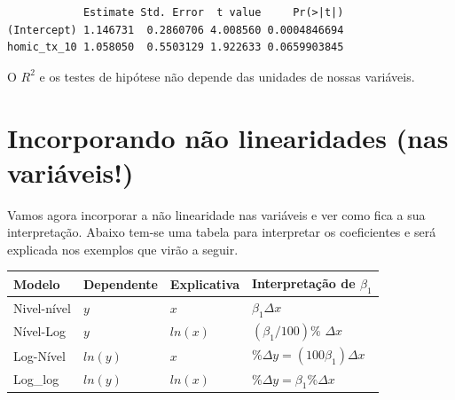 \documentclass[
  letterpaper,
  DIV=11,
  numbers=noendperiod]{scrreprt}
\begin{document}
\begin{verbatim}
            Estimate Std. Error  t value     Pr(>|t|)
(Intercept) 1.146731  0.2860706 4.008560 0.0004846694
homic_tx_10 1.058050  0.5503129 1.922633 0.0659903845
\end{verbatim}

\begin{tcolorbox}[enhanced jigsaw, leftrule=.75mm, coltitle=black, colframe=quarto-callout-note-color-frame, toprule=.15mm, opacitybacktitle=0.6, bottomtitle=1mm, bottomrule=.15mm, titlerule=0mm, toptitle=1mm, title=\textcolor{quarto-callout-note-color}{\faInfo}\hspace{0.5em}{Importante}, arc=.35mm, breakable, opacityback=0, colbacktitle=quarto-callout-note-color!10!white, colback=white, left=2mm, rightrule=.15mm]

O \(R^2\) e os testes de hipótese não depende das unidades de nossas
variáveis.

\end{tcolorbox}

\section{Incorporando não linearidades (nas
variáveis!)}\label{incorporando-nuxe3o-linearidades-nas-variuxe1veis}

Vamos agora incorporar a não linearidade nas variáveis e ver como fica a
sua interpretação. Abaixo tem-se uma tabela para interpretar os
coeficientes e será explicada nos exemplos que virão a seguir.

\begin{longtable}[]{@{}
  >{\raggedright\arraybackslash}p{}
  >{\raggedright\arraybackslash}p{}
  >{\raggedright\arraybackslash}p{}
  >{\raggedright\arraybackslash}p{}@{}}
\toprule\noalign{}
\begin{minipage}[b]{\linewidth}\raggedright
Modelo
\end{minipage} & \begin{minipage}[b]{\linewidth}\raggedright
Dependente
\end{minipage} & \begin{minipage}[b]{\linewidth}\raggedright
Explicativa
\end{minipage} & \begin{minipage}[b]{\linewidth}\raggedright
Interpretação de \(\beta_1\)
\end{minipage} \\
\midrule\noalign{}
\endhead
\bottomrule\noalign{}
\endlastfoot
Nivel-nível & \(y\) & \(x\) & \(\beta_1 \Delta x\) \\
Nível-Log & \(y\) & \(ln(x)\) & \((\beta_1/100)\%\) \(\Delta x\) \\
Log-Nível & \(ln(y)\) & \(x\) &
\(\% \Delta y = (100 \beta_1) \Delta x\) \\
Log\_log & \(ln(y)\) & \(ln(x)\) &
\(\% \Delta y = \beta_1\% \Delta x\) \\
\end{longtable}
\end{document}
